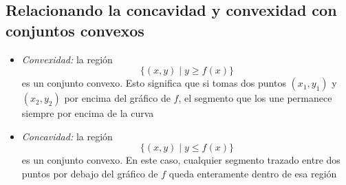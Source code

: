 \documentclass{article}
\begin{document}
\subsection*{Relacionando la concavidad y convexidad con conjuntos convexos}

\begin{itemize}
  \item \emph{Convexidad:} la región
    \[
      \bigl\{(x,y)\mid y \ge f(x)\bigr\}
    \]
    es un conjunto convexo. Esto significa que si tomas dos puntos
    \((x_1,y_1)\) y \((x_2,y_2)\) por encima del gráfico de \(f\),
    el segmento que los une permanece siempre por encima de la curva
  \item \emph{Concavidad:} la región
    \[
      \bigl\{(x,y)\mid y \le f(x)\bigr\}
    \]
    es un conjunto convexo. En este caso, cualquier segmento trazado
    entre dos puntos por debajo del gráfico de \(f\) queda enteramente
    dentro de esa región
\end{itemize}

\begin{center}
\end{center}
\end{document}
